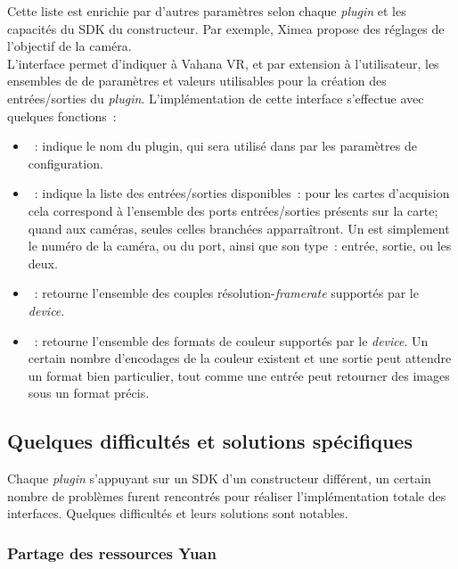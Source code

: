 Cette liste est enrichie par d'autres paramètres selon chaque \textit{plugin} et 
les capacités du SDK du constructeur. Par exemple, Ximea propose des réglages
de l'objectif de la caméra.\\
\newline
L'interface  permet d'indiquer à Vahana VR, et par extension
à l'utilisateur, les ensembles de de paramètres et valeurs utilisables pour la
création des entrées/sorties du \textit{plugin}. 
L'implémentation de cette interface s'effectue avec quelques fonctions~:
\begin{itemize}
  \item {}~: indique le nom du plugin, qui sera utilisé
  dans par les paramètres de configuration.
  \item {}~: indique la liste des entrées/sorties
  disponibles~: pour les cartes d'acquision cela correspond à l'ensemble des ports
  entrées/sorties présents sur la carte; quand aux caméras, seules celles branchées apparraîtront. 
  Un  est simplement le numéro de la caméra, ou du port, ainsi
  que son type~: entrée, sortie, ou les deux.
  \item {}~:
  retourne l'ensemble des couples résolution-\textit{framerate} supportés par le \textit{device}.
  \item {}~:
  retourne l'ensemble des formats de couleur supportés par le \textit{device}. Un 
  certain nombre d'encodages de la couleur existent et une sortie peut attendre un
  format bien particulier, tout comme une entrée peut retourner des images sous un
  format précis.
\end{itemize}

\subsection{Quelques difficultés et solutions spécifiques}
Chaque \textit{plugin} s'appuyant sur un SDK d'un constructeur différent, un certain nombre
de problèmes furent rencontrés pour réaliser l'implémentation totale des interfaces.
Quelques difficultés et leurs solutions sont notables.

\subsubsection{Partage des ressources Yuan}

